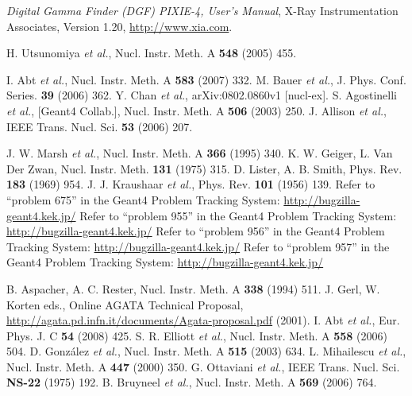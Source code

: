 \begin{thebibliography}{99}
\textit{Digital Gamma Finder (DGF) PIXIE-4, User's Manual}, X-Ray Instrumentation Associates, Version 1.20, \url{http://www.xia.com}.%

H. Utsunomiya \textit{et al.}, Nucl. Instr. Meth. A \textbf{548} (2005) 455.

I. Abt \textit{et al.}, Nucl. Instr. Meth. A \textbf{583} (2007) 332.
M. Bauer \textit{et al.}, J. Phys. Conf. Series. \textbf{39} (2006) 362.
Y. Chan \textit{et al.}, arXiv:0802.0860v1 [nucl-ex].
S. Agostinelli \textit{et al.}, [Geant4 Collab.], Nucl. Instr. Meth. A \textbf{506} (2003) 250.
J. Allison \textit{et al.}, IEEE Trans. Nucl. Sci. \textbf{53} (2006) 207.

J. W. Marsh \textit{et al.}, Nucl. Instr. Meth. A \textbf{366} (1995) 340.
K. W. Geiger, L. Van Der Zwan, Nucl. Instr. Meth. \textbf{131} (1975) 315.
D. Lister, A. B. Smith, Phys. Rev. \textbf{183} (1969)   954.
J. J. Kraushaar \textit{et al.}, Phys. Rev. \textbf{101} (1956) 139.
Refer to ``problem 675'' in the Geant4 Problem Tracking System: \url{http://bugzilla-geant4.kek.jp/}
Refer to ``problem 955'' in the Geant4 Problem Tracking System: \url{http://bugzilla-geant4.kek.jp/}
Refer to ``problem 956'' in the Geant4 Problem Tracking System: \url{http://bugzilla-geant4.kek.jp/}
Refer to ``problem 957'' in the Geant4 Problem Tracking System: \url{http://bugzilla-geant4.kek.jp/}

B. Aspacher, A. C. Rester, Nucl. Instr. Meth. A \textbf{338} (1994) 511.
J. Gerl, W. Korten eds., Online AGATA Technical Proposal, \url{http://agata.pd.infn.it/documents/Agata-proposal.pdf} (2001).
I. Abt \textit{et al.}, Eur. Phys. J. C \textbf{54} (2008) 425.
S. R. Elliott \textit{et al.}, Nucl. Instr. Meth. A \textbf{558} (2006) 504.
D. Gonz\'alez \textit{et al.}, Nucl. Instr. Meth. A \textbf{515} (2003) 634.
L. Mihailescu \textit{et al.}, Nucl. Instr. Meth. A \textbf{447} (2000) 350.
G. Ottaviani \textit{et al.}, IEEE Trans. Nucl. Sci. \textbf{NS-22} (1975) 192.
B. Bruyneel \textit{et al.}, Nucl. Instr. Meth. A \textbf{569} (2006) 764.%

\end{thebibliography}


